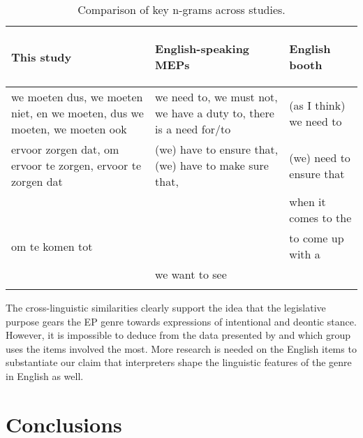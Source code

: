 \documentclass[output=paper]{langscibook}
\begin{document}
\begin{table}
\begin{tabularx}{\textwidth}{XXX}

\lsptoprule
{\bfseries This study} & {\bfseries \citet{granger_lexical_2014}}

{\bfseries English-speaking MEPs} & {\bfseries \citet{Aston2018}}

{\bfseries English booth}\\
\midrule
we moeten dus, we moeten niet, en we moeten, dus we moeten, we moeten ook & we need to, we must not, we have a duty to, there is a need for/to & (as I think) we need to \\
\rule{0pt}{1.5em}ervoor zorgen dat, om ervoor te zorgen, ervoor te zorgen dat & (we) have to ensure that, (we) have to make sure that, & (we) need to ensure that\\
\rule{0pt}{1.5em}&  & when it comes to the\\
\rule{0pt}{1.5em}om te komen tot &  & to come up with a\\
\rule{0pt}{1.5em}& we want to see & \\
\lspbottomrule
\end{tabularx}
\caption{Comparison of key n-grams across studies.}
\label{tab:defrancq:3}
\end{table}

The cross-linguistic similarities clearly support the idea that the legislative purpose gears the EP genre towards expressions of intentional and deontic stance. However, it is impossible to deduce from the data presented by \citet{Aston2018} and \citet{granger_lexical_2014} which group uses the items involved the most. More research is needed on the English items to substantiate our claim that interpreters shape the linguistic features of the genre in English as well. 

\section{Conclusions}\label{sec:defrancq:6}
\end{document}
